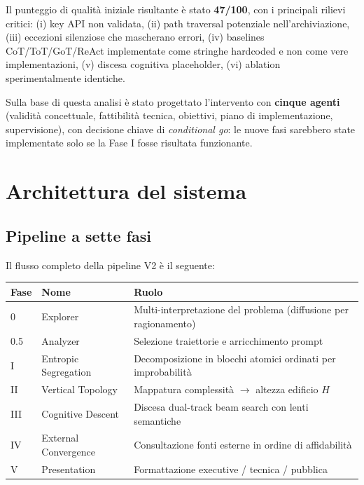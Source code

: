 \documentclass[11pt,a4paper]{article}
\begin{document}
Il punteggio di qualità iniziale risultante è stato \textbf{47/100}, con i principali
rilievi critici: (i) key API non validata, (ii) path traversal potenziale
nell'archiviazione, (iii) eccezioni silenziose che mascherano errori, (iv) baselines
CoT/ToT/GoT/ReAct implementate come stringhe hardcoded e non come vere
implementazioni, (v) discesa cognitiva placeholder, (vi) ablation
sperimentalmente identiche.

Sulla base di questa analisi è stato progettato l'intervento con \textbf{cinque
agenti} (validità concettuale, fattibilità tecnica, obiettivi, piano di
implementazione, supervisione), con decisione chiave di \emph{conditional go}: le
nuove fasi sarebbero state implementate solo se la Fase I fosse risultata funzionante.

\section{Architettura del sistema}
\label{sec:architettura}

\subsection{Pipeline a sette fasi}

Il flusso completo della pipeline V2 è il seguente:

\begin{center}
\small
\begin{tabular}{l l l}
\toprule
\textbf{Fase} & \textbf{Nome} & \textbf{Ruolo} \\
\midrule
0    & Explorer           & Multi-interpretazione del problema (diffusione per ragionamento) \\
0.5  & Analyzer           & Selezione traiettorie e arricchimento prompt \\
I    & Entropic Segregation & Decomposizione in blocchi atomici ordinati per improbabilità \\
II   & Vertical Topology  & Mappatura complessità $\rightarrow$ altezza edificio $H$ \\
III  & Cognitive Descent  & Discesa dual-track beam search con lenti semantiche \\
IV   & External Convergence & Consultazione fonti esterne in ordine di affidabilità \\
V    & Presentation       & Formattazione executive / tecnica / pubblica \\
\bottomrule
\end{tabular}
\end{center}
\end{document}
